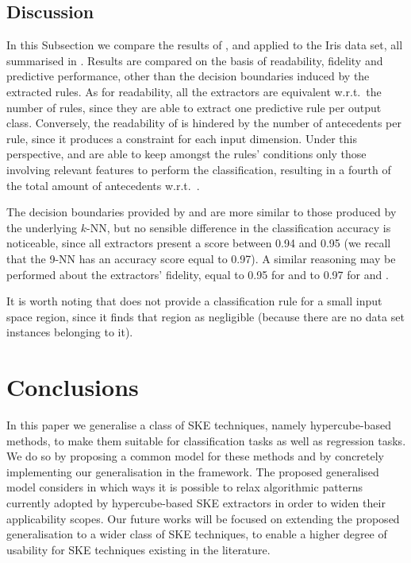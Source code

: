 \documentclass[
]{ceurart}
\begin{document}
\subsection{Discussion}



In this Subsection we compare the results of \cart{}, \iter{} and \gridex{} applied to the Iris data set, all summarised in .
%
Results are compared on the basis of readability, fidelity and predictive performance, other than the decision boundaries induced by the extracted rules.
%
As for readability, all the extractors are equivalent w.r.t.\ the number of rules, since they are able to extract one predictive rule per output class.
%
Conversely, the readability of \iter{} is hindered by the number of antecedents per rule, since it produces a constraint for each input dimension.
%
Under this perspective, \cart{} and \gridex{} are able to keep amongst the rules' conditions only those involving relevant features to perform the classification, resulting in a fourth of the total amount of antecedents w.r.t.\ \iter{}.

The decision boundaries provided by \gridex{} and \iter{} are more similar to those produced by the underlying $k$-NN, but no sensible difference in the classification accuracy is noticeable, since all extractors present a score between 0.94 and 0.95 (we recall that the 9-NN has an accuracy score equal to 0.97).
%
A similar reasoning may be performed about the extractors' fidelity, equal to 0.95 for \cart{} and to 0.97 for \iter{} and \gridex{}.

It is worth noting that \gridex{} does not provide a classification rule for a small input space region, since it finds that region as negligible (because there are no data set instances belonging to it).

\section{Conclusions}\label{sec:conclusions}

In this paper we generalise a class of SKE techniques, namely hypercube-based methods, to make them suitable for classification tasks as well as regression tasks.
%
We do so by proposing a common model for these methods and by concretely implementing our generalisation in the \psyke{} framework.
%
The proposed generalised model considers in which ways it is possible to relax algorithmic patterns currently adopted by hypercube-based SKE extractors in order to widen their applicability scopes.
%
Our future works will be focused on extending the proposed generalisation to a wider class of SKE techniques, to enable a higher degree of usability for SKE techniques existing in the literature.
\end{document}
